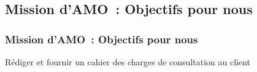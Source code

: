 \subsection{Mission d'AMO~: Objectifs pour nous}
\begin{frame}
	\frametitle{Mission d'AMO~: Objectifs pour nous} \pause
	\begin{block}{}
	Rédiger et fournir un cahier des charges de consultation au client
	\end{block}
\end{frame}

